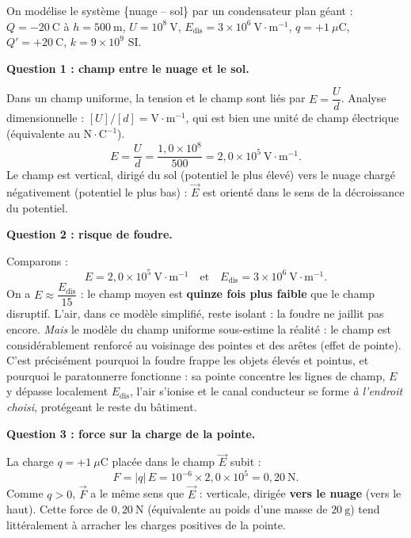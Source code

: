 \documentclass[11pt]{article}
\newcounter{popsec}
\newcounter{popsub}
\newcommand{\courssub}[1]{%
  \stepcounter{popsub}%
  \par\vspace{9pt}\noindent{\popxbold\fontsize{11.5}{13}\selectfont\color{popink}{\color{poporange}\thepopsec.\thepopsub}\hspace{6pt}#1}\par\nopagebreak\vspace{4pt}
}
\begin{document}
\courssub{Démarche et corrigé commenté}

\begin{exoresolu}
On modélise le système \{nuage -- sol\} par un condensateur plan géant : $Q = -20~\text{C}$ à $h = 500~\text{m}$, $U = 10^{8}~\text{V}$, $E_{\text{dis}} = 3\times 10^{6}~\text{V}\cdot\text{m}^{-1}$, $q = +1~\mu\text{C}$, $Q' = +20~\text{C}$, $k = 9\times 10^{9}$ SI.

\tcblower

\textbf{Question 1 : champ entre le nuage et le sol.}

Dans un champ uniforme, la tension et le champ sont liés par $E = \dfrac{U}{d}$. Analyse dimensionnelle : $[U]/[d] = \text{V}\cdot\text{m}^{-1}$, qui est bien une unité de champ électrique (équivalente au $\text{N}\cdot\text{C}^{-1}$).
\[
E = \frac{U}{d} = \frac{1{,}0\times 10^{8}}{500} = 2{,}0\times 10^{5}~\text{V}\cdot\text{m}^{-1}.
\]
Le champ est vertical, dirigé du sol (potentiel le plus élevé) vers le nuage chargé négativement (potentiel le plus bas) : $\vec{E}$ est orienté dans le sens de la décroissance du potentiel.

\textbf{Question 2 : risque de foudre.}

Comparons :
\[
E = 2{,}0\times 10^{5}~\text{V}\cdot\text{m}^{-1} \quad \text{et} \quad E_{\text{dis}} = 3\times 10^{6}~\text{V}\cdot\text{m}^{-1}.
\]
On a $E \approx \dfrac{E_{\text{dis}}}{15}$ : le champ moyen est \textbf{quinze fois plus faible} que le champ disruptif. L'air, dans ce modèle simplifié, reste isolant : la foudre ne jaillit pas encore. \emph{Mais} le modèle du champ uniforme sous-estime la réalité : le champ est considérablement renforcé au voisinage des pointes et des arêtes (effet de pointe). C'est précisément pourquoi la foudre frappe les objets élevés et pointus, et pourquoi le paratonnerre fonctionne : sa pointe concentre les lignes de champ, $E$ y dépasse localement $E_{\text{dis}}$, l'air s'ionise et le canal conducteur se forme \emph{à l'endroit choisi}, protégeant le reste du bâtiment.

\textbf{Question 3 : force sur la charge de la pointe.}

La charge $q = +1~\mu\text{C}$ placée dans le champ $\vec{E}$ subit :
\[
F = |q|\,E = 10^{-6}\times 2{,}0\times 10^{5} = 0{,}20~\text{N}.
\]
Comme $q>0$, $\vec{F}$ a le même sens que $\vec{E}$ : verticale, dirigée \textbf{vers le nuage} (vers le haut). Cette force de $0{,}20~\text{N}$ (équivalente au poids d'une masse de $20~\text{g}$) tend littéralement à arracher les charges positives de la pointe.


\end{exoresolu}
\end{document}

